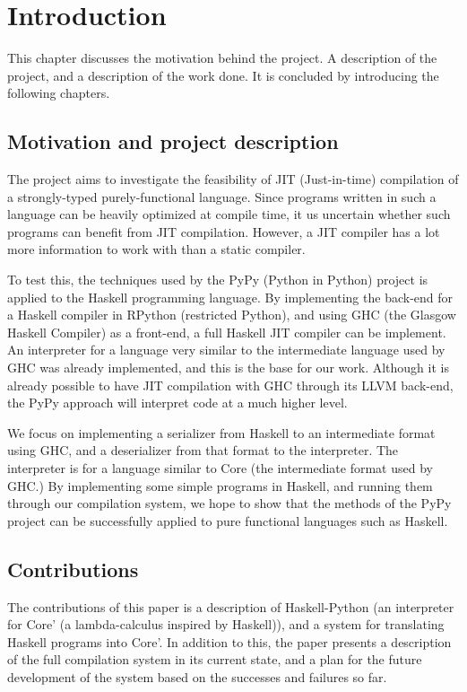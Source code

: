 
\chapter{Introduction}

This chapter discusses the motivation behind the project. A description
of the project, and a description of the work done. It is concluded by 
introducing the following chapters.

\section{Motivation and project description}

The project aims to investigate the feasibility of JIT (Just-in-time) 
compilation of a strongly-typed purely-functional language. Since
programs written in such a language can be heavily optimized at 
compile time, it us uncertain whether such programs can benefit from
JIT compilation. However, a JIT compiler has a lot more information to
work with than a static compiler. 

To test this, the techniques 
used by the PyPy (Python in Python) project is applied to the Haskell 
programming language. By implementing the back-end for a Haskell compiler 
in RPython (restricted Python), and using GHC (the Glasgow Haskell Compiler) 
as a front-end, a full Haskell JIT compiler can be implement. An 
interpreter for a language very similar to the intermediate language used
by GHC was already implemented, and this is the base for our work.
Although it is already possible to have JIT compilation with GHC through
its LLVM back-end, the PyPy approach will interpret code at a much higher level.

We focus on implementing a serializer from Haskell to an intermediate
format using GHC, and a deserializer from that format to the interpreter. The 
interpreter is for a language similar to Core (the intermediate format used by GHC.)
By implementing some simple programs in Haskell, and running them through our 
compilation system, 
we hope to show that the methods of the PyPy project can be successfully applied 
to pure functional languages such as Haskell.


\section{Contributions}
The contributions of this paper is a description of Haskell-Python (an
interpreter for Core' (a lambda-calculus inspired by Haskell)), and a system for
translating Haskell programs into Core'. In addition to this, the paper 
presents a description of the full compilation system in its current state,
and a plan for the future development of the system based on the 
successes and failures so far.

